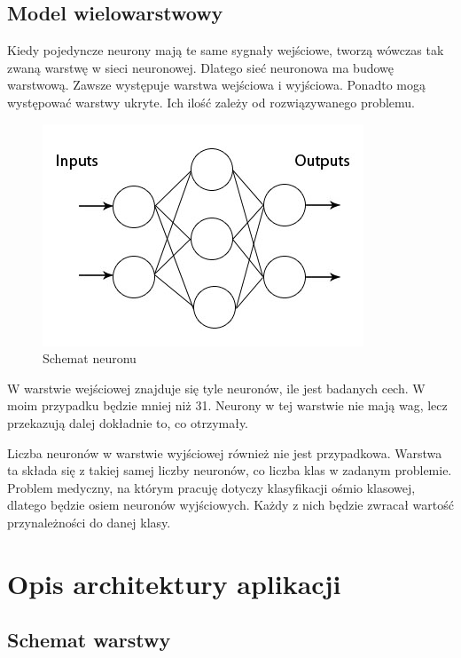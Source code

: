 \documentclass{report}
\begin{document}
    \section{Model wielowarstwowy}

    Kiedy pojedyncze neurony mają te same sygnały wejściowe, tworzą wówczas tak zwaną warstwę w sieci neuronowej.
    Dlatego sieć neuronowa ma budowę warstwową.
    Zawsze występuje warstwa wejściowa i wyjściowa.
    Ponadto mogą występować warstwy ukryte.
    Ich ilość zależy od rozwiązywanego problemu.

    \begin{figure}[h!]
        \centering
        \includegraphics[scale=0.9]{./img/mlp.jpg}
        \caption{Schemat neuronu}
    \end{figure}

    W warstwie wejściowej znajduje się tyle neuronów, ile jest badanych cech.
    W moim przypadku będzie mniej niż 31.
    Neurony w tej warstwie nie mają wag, lecz przekazują dalej dokładnie to, co otrzymały.

    Liczba neuronów w warstwie wyjściowej również nie jest przypadkowa.
    Warstwa ta składa się z takiej samej liczby neuronów, co liczba klas w zadanym problemie.
    Problem medyczny, na którym pracuję dotyczy klasyfikacji ośmio klasowej, dlatego będzie osiem neuronów wyjściowych.
    Każdy z nich będzie zwracał wartość przynależności do danej klasy.


    \chapter{Opis architektury aplikacji}

    \section{Schemat warstwy}
\end{document}
